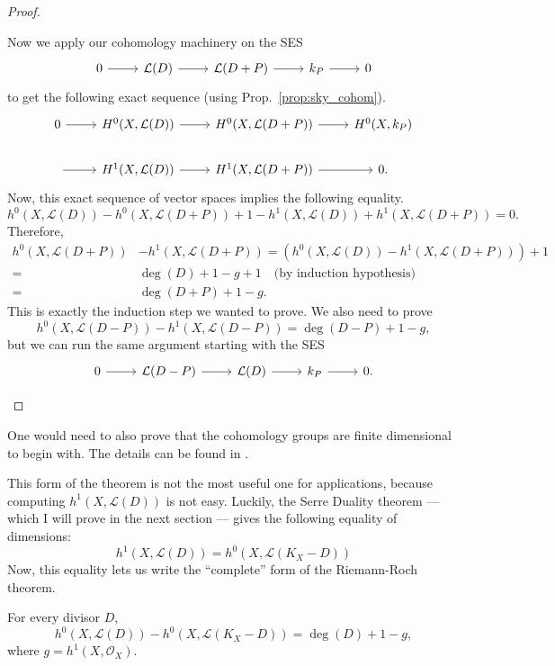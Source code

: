 \begin{proof}
\begin{description}[style=nextline]
          Now we apply our cohomology machinery on the SES
          \[
          \begin{tikzcd}
            0\arrow{r} & \mathcal{L}(D)\arrow{r} & \mathcal{L}(D+P)\arrow{r}
            & k_{P}\arrow{r} & 0
          \end{tikzcd}
          \]
          to get the following exact sequence (using
          Prop.~\ref{prop:sky_cohom}).
          \[
          \begin{tikzcd}
            0\arrow{r} & H^{0}(X, \mathcal{L}(D))\arrow{r}
            & H^{0}(X, \mathcal{L}(D+P))\arrow{r}
            & H^{0}(X, k_{P}) \\
            \arrow{r} & H^{1}(X, \mathcal{L}(D))\arrow{r}
            & H^{1}(X, \mathcal{L}(D+P))\arrow{r} & 0.
          \end{tikzcd}
          \]
          Now, this exact sequence of vector spaces implies the following
          equality.
          \[
          h^{0}(X,\mathcal{L}(D))-h^{0}(X, \mathcal{L}(D+P))
          +1-h^{1}(X,\mathcal{L}(D))+h^{1}(X,\mathcal{L}(D+P)) = 0.
          \]
          Therefore,
          \begin{align*}
            h^{0}(X,\mathcal{L}(D+P))&-h^{1}(X,\mathcal{L}(D+P))
            =\left(h^{0}(X,\mathcal{L}(D))-h^{1}(X,\mathcal{L}(D+P))\right)
              +1 \\
            =&\deg(D)+1-g+1\quad\text{(by induction hypothesis)} \\
            =&\deg(D+P)+1-g.
          \end{align*}
          This is exactly the induction step we wanted to prove.
          We also need to prove
          \[
            h^{0}(X,\mathcal{L}(D-P))-h^{1}(X,\mathcal{L}(D-P))
            =\deg(D-P)+1-g,
          \]
          but we can run the same argument starting with the SES
          \[
          \begin{tikzcd}
            0\arrow{r} & \mathcal{L}(D-P)\arrow{r} & \mathcal{L}(D)\arrow{r}
            & k_{P}\arrow{r} & 0.
          \end{tikzcd}
          \]
  \end{description}
\end{proof}
\begin{rem}
  One would need to also prove that the cohomology groups are finite
  dimensional to begin with. The details can be found in \cite{serre}.
\end{rem}

This form of the theorem is not the most useful one for applications,
because computing $h^{1}(X,\mathcal{L}(D))$ is not easy. Luckily, the Serre
Duality theorem --- which I will prove in the next section --- gives the
following equality of dimensions:
\[h^{1}(X,\mathcal{L}(D))=h^{0}(X,\mathcal{L}(K_{X}-D))\]
Now, this equality lets us write the ``complete'' form of the Riemann-Roch
theorem.
\begin{thm}\label{thm:riemann_roch}
  For every divisor $D$,
  \[
    h^{0}(X, \mathcal{L}(D))-h^{0}(X, \mathcal{L}(K_{X}-D))=\deg(D)+1-g,
  \]
  where $g=h^{1}(X, \mathscr{O}_{X})$.
\end{thm}

